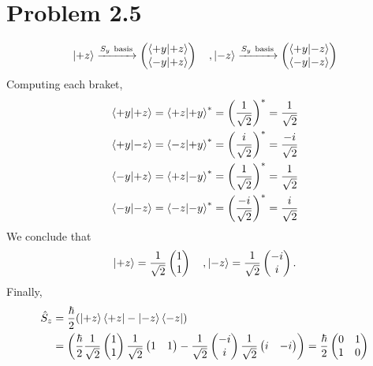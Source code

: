 \documentclass[
	12pt,
	]{article}
\theoremstyle{definition}
\theoremstyle{definition}
\theoremstyle{definition}
\theoremstyle{definition}
\theoremstyle{definition}
\theoremstyle{example}
\theoremstyle{note}
\theoremstyle{remark}
\theoremstyle{example}
\begin{document}
		\section*{Problem 2.5}
				\begin{equation} \ket{+z} \xrightarrow{S_{y} \ \text{basis}} \begin{pmatrix}
				\braket{+y}{+z} \\ \braket{-y}{+z}
				\end{pmatrix} \quad, \ket{-z} \xrightarrow{S_{y} \ \text{basis}} \begin{pmatrix}
				\braket{+y}{-z} \\ \braket{-y}{-z}
				\end{pmatrix} 
				\end{equation}
				Computing each braket, 
				\begin{align*}
					\braket{+y}{+z} &= \braket{+z}{+y}^{\ast} = \left(\frac{1}{\sqrt{2 }}\right)^{\ast} = \frac{1}{\sqrt{2}}\\
					\braket{+y}{-z} &= \braket{-z}{+y}^{\ast} = \left(\frac{i}{\sqrt{2 }}\right)^{\ast} = \frac{-i}{\sqrt{2}} \\
					\braket{-y}{+z} &= \braket{+z}{-y}^{\ast} = \left(\frac{1}{\sqrt{2 }}\right)^{\ast} = \frac{1}{\sqrt{2}} \\
					\braket{-y}{-z} &= \braket{-z}{-y}^{\ast} = \left(\frac{-i}{\sqrt{2 }}\right)^{\ast} = \frac{i}{\sqrt{2}}
				\end{align*} 
				We conclude that 
				$$ \ket{+z} = \frac{1}{\sqrt{2}} \begin{pmatrix}
				1 \\1 
				\end{pmatrix} \quad , \ket{-z} = \frac{1}{\sqrt{2}} \begin{pmatrix}
					-i \\ i
				\end{pmatrix}.$$
				Finally, 
				\begin{align*}
					\hat{S}_{z} &= \frac{\hbar }{2} (\ket{+z}\bra{+z} - \ket{-z}\bra{-z}) \\
					&=\left(\frac{\hbar}{2} \frac{1}{\sqrt{2}} \begin{pmatrix}
					1 \\ 1
					\end{pmatrix} \frac{1}{\sqrt{2}} \begin{pmatrix}
					1 & 1
					\end{pmatrix} - \frac{1}{\sqrt{2}} \begin{pmatrix}
					-i \\ i
					\end{pmatrix}\frac{1}{\sqrt{2}}\begin{pmatrix}
					i & -i
					\end{pmatrix}\right) = \frac{\hbar}{2} \begin{pmatrix}
					0 &1 \\
					1 & 0
					\end{pmatrix}
				\end{align*}
\end{document}

